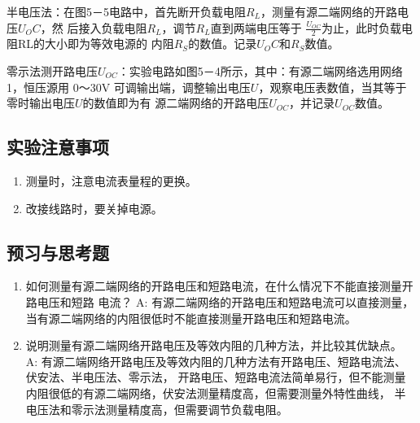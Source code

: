 \documentclass[UTF8]{article}
\begin{document}
\begin{enumerate}
                \noindent\hspace{2em}半电压法：在图5－5电路中，首先断开负载电阻$R_L$，测量有源二端网络的开路电压$U_OC$，然
                后接入负载电阻$R_L$，调节$R_L$直到两端电压等于
                $\frac{U_{OC}}{2}$为止，此时负载电阻RL的大小即为等效电源的
                内阻$R_S$的数值。记录$U_OC$和$R_S$数值。
                \par
                \noindent\hspace{2em}零示法测开路电压$U_{OC}$：实验电路如图5－4所示，其中：有源二端网络选用网络1，恒压源用
                0～30V 可调输出端，调整输出电压$U$，观察电压表数值，当其等于零时输出电压$U$的数值即为有
                源二端网络的开路电压$U_{OC}$，并记录$U_{OC}$数值。 
            \end{enumerate}
        \subsection{实验注意事项}
            \begin{enumerate}[label=\textbf{\arabic*}.]
                \item 测量时，注意电流表量程的更换。
                \item 改接线路时，要关掉电源。 
            \end{enumerate}
        \subsection{预习与思考题}
            \begin{enumerate}[label=\textbf{\arabic*}.]
                \item 如何测量有源二端网络的开路电压和短路电流，在什么情况下不能直接测量开路电压和短路
                电流？\newline
                A: 有源二端网络的开路电压和短路电流可以直接测量，当有源二端网络的内阻很低时不能直接测量开路电压和短路电流。
                \item 说明测量有源二端网络开路电压及等效内阻的几种方法，并比较其优缺点。\newline
                A: 有源二端网络开路电压及等效内阻的几种方法有开路电压、短路电流法、伏安法、半电压法、零示法，
                开路电压、短路电流法简单易行，但不能测量内阻很低的有源二端网络，伏安法测量精度高，但需要测量外特性曲线，
                半电压法和零示法测量精度高，但需要调节负载电阻。
            \end{enumerate}
\end{document}
